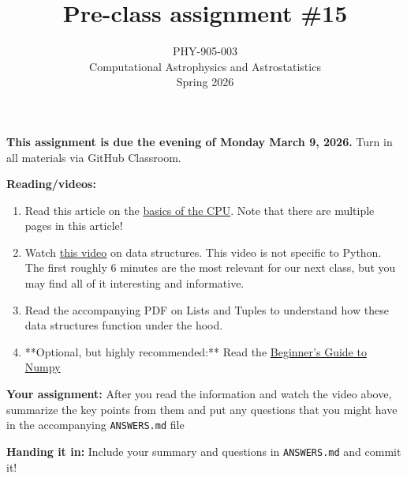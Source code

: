 \documentclass[10pt]{article}
\title{Pre-class assignment \#15}
\author{PHY-905-003\\Computational Astrophysics and
  Astrostatistics\\Spring 2026}
\date{} %
\begin{document}
 
\maketitle

\vspace{-5mm}

\noindent
\textbf{This assignment is due the evening of Monday March 9, 2026.}
 Turn in all materials via GitHub Classroom.

\vspace{5mm}

\noindent
\textbf{Reading/videos:}

\begin{enumerate}

\item Read this article on the
  \href{https://www.bbc.co.uk/bitesize/guides/zws8d2p/revision/1}{basics
    of the CPU}.  Note that there are multiple pages in this article!

  
  
\item Watch
  \href{https://thecrashcourse.com/courses/data-structures-crash-course-computer-science-14/}{this
  video} on data structures. This video is not specific to Python. The first roughly 6 minutes are the most relevant for our next class, but you may find all of it interesting and informative.

  \item Read the accompanying PDF on Lists and Tuples to understand
    how these data structures function under the hood.

\item **Optional, but highly recommended:** Read the
  \href{https://numpy.org/doc/stable/user/absolute_beginners.html}{Beginner's
  Guide to Numpy}

\end{enumerate}

\noindent
\textbf{Your assignment:}  After you read the information and watch
the video above, summarize the key points from them and put any
questions that you might have in the accompanying \texttt{ANSWERS.md}
file

\noindent
\textbf{Handing it in:}
Include your summary and questions in \texttt{ANSWERS.md} and commit it!
\end{document}
